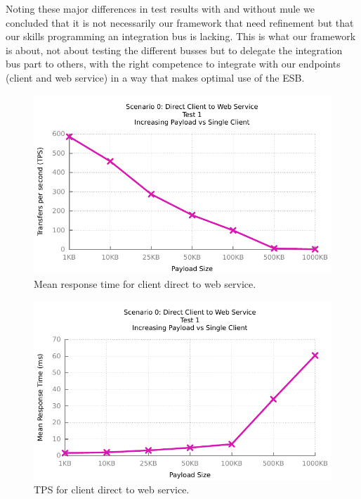 Noting these major differences in test results with and without mule we concluded that it is not necessarily our framework that need refinement but that our skills programming an integration bus is lacking. This is what our framework is about, not about testing the different busses but to delegate the integration bus part to others, with the right competence to integrate with our endpoints (client and web service) in a way that makes optimal use of the ESB.

\begin{figure}[H]
	\caption{Mean response time for client direct to web service.}
	\centerline{\includegraphics{img/direct_fu_ip_tps}}
	\label{fig:direct-1-1}
\end{figure}

\begin{figure}[H]
	\caption{TPS for client direct to web service.}
	\centerline{\includegraphics{img/direct_fu_ip_resp}}
	\label{fig:direct-1-2}
\end{figure}

